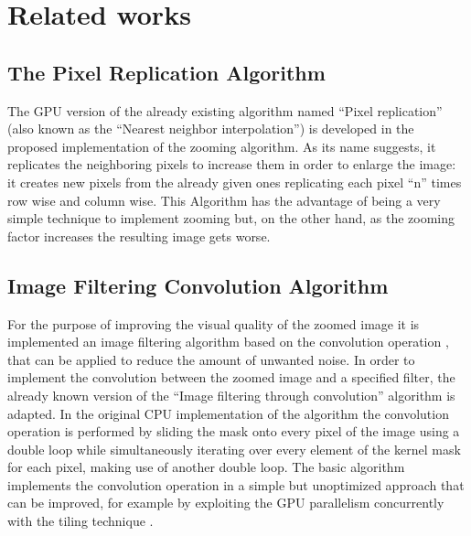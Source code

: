 \section{Related works}

    \subsection{The Pixel Replication Algorithm}
    The GPU version of the already existing algorithm named “Pixel replication” \cite{zoom_meth} (also known as the “Nearest neighbor interpolation”) is developed in the proposed implementation of the zooming algorithm.
    As its name suggests, it replicates the neighboring pixels to increase them in order to enlarge the image: it creates new pixels from the already given ones replicating each pixel “n” times row wise and column wise.
    This Algorithm has the advantage of being a very simple technique to implement zooming but, on the other hand, as the zooming factor increases the resulting image gets worse.


    \subsection{Image Filtering Convolution Algorithm}
    For the purpose of improving the visual quality of the zoomed image it is implemented an image filtering algorithm based on the convolution operation \cite{conv_slides}, that can be applied to reduce the amount of unwanted noise. 
    In order to implement the convolution between the zoomed image and a specified filter, the already known version of the “Image filtering through convolution” algorithm is adapted.
    In the original CPU implementation of the algorithm the convolution operation is performed by sliding the mask onto every pixel of the image using a double loop while simultaneously iterating over every element of the kernel mask for each pixel, making use of another double loop.
    The basic algorithm implements the convolution operation in a simple but unoptimized approach that can be improved, for example by exploiting the GPU parallelism concurrently with the tiling technique \cite{tiled_conv_slides}. 
